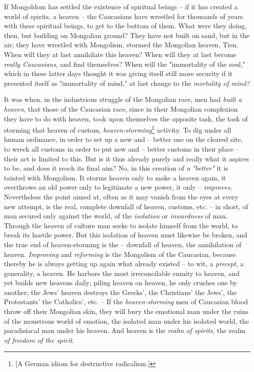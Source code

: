 If Mongoldom has settled the existence of spiritual beings -- if it has 
created a world of spirits, a heaven -- the Caucasians have wrestled for 
thousands of years with these spiritual beings, to get to the bottom of them. 
What were they doing, then, but building on Mongolian ground? They have not 
built on sand, but in the air; they have wrestled with Mongolism, stormed the 
Mongolian heaven, Tien. When will they at last annihilate this heaven? When 
will they at last become \textit{really Caucasians}, and find themselves? When 
will the "{}immortality of the soul,"{} which in these latter days thought it 
was giving itself still more security if it presented itself as "{}immortality 
of mind,"{} at last change to the \textit{mortality of mind?}

It was when, in the industrious struggle of the Mongolian race, men had 
\textit{built a heaven}, that those of the Caucasian race, since in their 
Mongolian complexion they have to do with heaven, took upon themselves the 
opposite task, the task of storming that heaven of custom, 
\textit{heaven-storming}\footnote{[A German idiom for destructive 
radicalism.]} activity. To dig under all human ordinance, in order to set up a 
new and -- better one on the cleared site, to wreck all customs in order to 
put new and -- better customs in their place -- their act is limited to this. 
But is it thus already purely and really what it aspires to be, and does it 
reach its final aim? No, in this creation of \textit{a "{}better"{}} it is 
tainted with Mongolism. It storms heaven only to make a heaven again, it 
overthrows an old power only to legitimate a new power, it only -- 
\textit{improves}. Nevertheless the point aimed at, often as it may vanish 
from the eyes at every new attempt, is the real, complete downfall of heaven, 
customs, etc. -- in short, of man secured only against the world, of the 
\textit{isolation} or \textit{inwardness} of man. Through the heaven of 
culture man seeks to isolate himself from the world, to break its hostile 
power. But this isolation of heaven must likewise be broken, and the true end 
of heaven-storming is the -- downfall of heaven, the annihilation of heaven. 
\textit{Improving} and \textit{reforming} is the Mongolism of the Caucasian, 
because thereby he is always getting up again what already existed -- to wit, 
a \textit{precept}, a generality, a heaven. He harbors the most irreconcilable 
enmity to heaven, and yet builds new heavens daily; piling heaven on heaven, 
he only crushes one by another; the Jews' heaven destroys the Greeks', the 
Christians' the Jews', the Protestants' the Catholics', etc. -- If the 
\textit{heaven-storming} men of Caucasian blood throw off their Mongolian 
skin, they will bury the emotional man under the ruins of the monstrous world 
of emotion, the isolated man under his isolated world, the paradisiacal man 
under his heaven. And heaven is the \textit{realm of spirits}, the realm 
\textit{of freedom of the spirit}.

